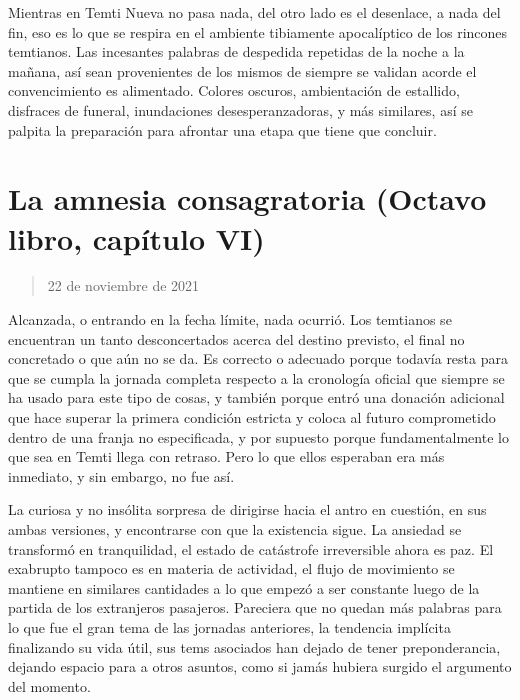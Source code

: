 \documentclass[
  spanish,
]{book}
\begin{document}
Mientras en Temti Nueva no pasa nada, del otro lado es el desenlace, a nada del fin, eso es lo que se respira en el ambiente tibiamente apocalíptico de los rincones temtianos. Las incesantes palabras de despedida repetidas de la noche a la mañana, así sean provenientes de los mismos de siempre se validan acorde el convencimiento es alimentado. Colores oscuros, ambientación de estallido, disfraces de funeral, inundaciones desesperanzadoras, y más similares, así se palpita la preparación para afrontar una etapa que tiene que concluir.

\hypertarget{la-amnesia-consagratoria-octavo-libro-capuxedtulo-vi}{%
\section{La amnesia consagratoria (Octavo libro, capítulo VI)}\label{la-amnesia-consagratoria-octavo-libro-capuxedtulo-vi}}

\begin{quote}
22 de noviembre de 2021
\end{quote}

Alcanzada, o entrando en la fecha límite, nada ocurrió. Los temtianos se encuentran un tanto desconcertados acerca del destino previsto, el final no concretado o que aún no se da. Es correcto o adecuado porque todavía resta para que se cumpla la jornada completa respecto a la cronología oficial que siempre se ha usado para este tipo de cosas, y también porque entró una donación adicional que hace superar la primera condición estricta y coloca al futuro comprometido dentro de una franja no especificada, y por supuesto porque fundamentalmente lo que sea en Temti llega con retraso. Pero lo que ellos esperaban era más inmediato, y sin embargo, no fue así.

La curiosa y no insólita sorpresa de dirigirse hacia el antro en cuestión, en sus ambas versiones, y encontrarse con que la existencia sigue. La ansiedad se transformó en tranquilidad, el estado de catástrofe irreversible ahora es paz. El exabrupto tampoco es en materia de actividad, el flujo de movimiento se mantiene en similares cantidades a lo que empezó a ser constante luego de la partida de los extranjeros pasajeros. Pareciera que no quedan más palabras para lo que fue el gran tema de las jornadas anteriores, la tendencia implícita finalizando su vida útil, sus tems asociados han dejado de tener preponderancia, dejando espacio para a otros asuntos, como si jamás hubiera surgido el argumento del momento.
\end{document}
